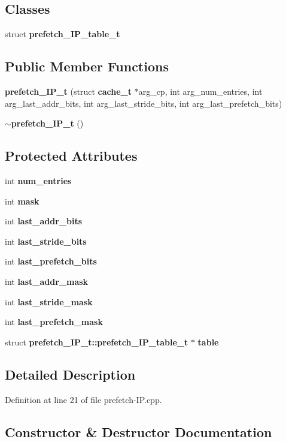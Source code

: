 \subsection*{Classes}
\begin{CompactItemize}
\item 
struct {\bf prefetch\_\-IP\_\-table\_\-t}
\end{CompactItemize}
\subsection*{Public Member Functions}
\begin{CompactItemize}
\item 
{\bf prefetch\_\-IP\_\-t} (struct {\bf cache\_\-t} $\ast$arg\_\-cp, int arg\_\-num\_\-entries, int arg\_\-last\_\-addr\_\-bits, int arg\_\-last\_\-stride\_\-bits, int arg\_\-last\_\-prefetch\_\-bits)
\item 
{\bf $\sim$prefetch\_\-IP\_\-t} ()
\end{CompactItemize}
\subsection*{Protected Attributes}
\begin{CompactItemize}
\item 
int {\bf num\_\-entries}
\item 
int {\bf mask}
\item 
int {\bf last\_\-addr\_\-bits}
\item 
int {\bf last\_\-stride\_\-bits}
\item 
int {\bf last\_\-prefetch\_\-bits}
\item 
int {\bf last\_\-addr\_\-mask}
\item 
int {\bf last\_\-stride\_\-mask}
\item 
int {\bf last\_\-prefetch\_\-mask}
\item 
struct {\bf prefetch\_\-IP\_\-t::prefetch\_\-IP\_\-table\_\-t} $\ast$ {\bf table}
\end{CompactItemize}


\subsection{Detailed Description}


Definition at line 21 of file prefetch-IP.cpp.

\subsection{Constructor \& Destructor Documentation}

